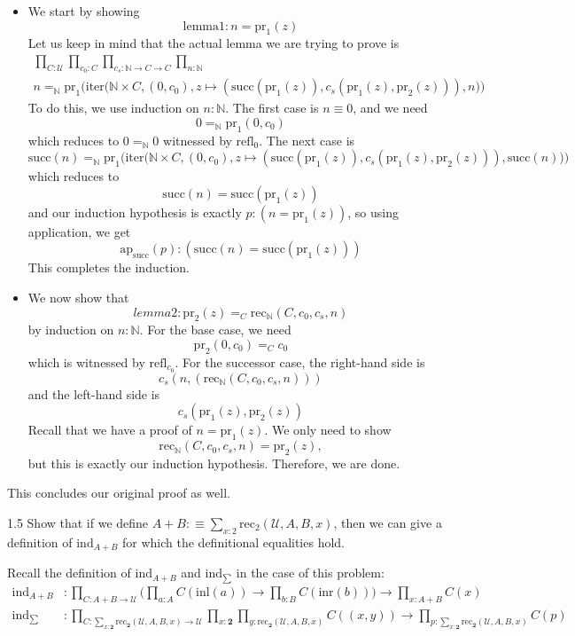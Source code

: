 \documentclass[14pt]{extarticle}
\newcommand{\N}{{\mathbb N}}
\newcommand{\0}{{\mathbf 0}}
\newcommand{\1}{{\mathbf 1}}
\newcommand{\2}{{\mathbf 2}}
\newcommand{\UU}{{\mathcal U}}
\newcommand{\mt}{\mapsto}
\newcommand{\rec}{\mathrm{rec}}
\newcommand{\su}{\mathrm{succ}}
\newcommand{\ind}{\mathrm{ind}}
\newcommand{\iter}{\mathrm{iter}}
\newcommand{\refl}{\mathrm{refl}}
\newcommand{\inl}{\mathrm{inl}}
\newcommand{\inr}{\mathrm{inr}}
\newcommand{\pr}{\mathrm{pr}}
\newcommand{\ap}{\mathrm{ap}}
\begin{document}
\begin{itemize}
\item We start by showing \[\mathrm{lemma1} : n = \pr_1(z)\] Let us keep in mind that the actual lemma we are trying to prove is
\begin{multline*}
\prod_{C : \UU}\prod_{c_0 : C}\prod_{c_s : \N \to C \to C}\prod_{n:\N} \\
n =_\N \pr_1\Big(\iter\Big(\N \times C, (0,c_0), z \mt (\su(\pr_1(z)) ,c_s(\pr_1(z), \pr_2(z))), n\Big)\Big)
\end{multline*}
To do this, we use induction on $n:\N$. The first case is $n \equiv 0$, and we need
\[0 =_\N \pr_1(0, c_0)\] which reduces to $0 =_\N 0$ witnessed by $\refl_0$. The next case is 
\[\su(n) =_\N \pr_1\Big(\iter\Big(\N \times C, (0,c_0), z \mt (\su(\pr_1(z)) ,c_s(\pr_1(z), \pr_2(z))), \su(n)\Big)\Big)\]
which reduces to 
\[\su(n) = \su(\pr_1(z))\] and our induction hypothesis is exactly $p : (n = \pr_1(z))$, so using application, we get
\[\ap_{\su}(p) : (\su(n) = \su(\pr_1(z)))\] This completes the induction.

\item We now show that \[lemma2 : \pr_2(z) =_C \rec_\N(C, c_0, c_s,n)\] by induction on $n : \N$. For the base case, we need
\[\pr_2(0, c_0) =_C c_0\] which is witnessed by $\refl_{c_0}$. For the successor case, the right-hand side is
\[c_s(n, (\rec_\N(C, c_0, c_s, n)))\] and the left-hand side is
\[c_s(\pr_1(z), \pr_2(z))\] Recall that we have a proof of $n = \pr_1(z)$. We only need to show \[\rec_\N(C, c_0, c_s, n) = \pr_2(z),\] but this is exactly our induction hypothesis. Therefore, we are done.
\end{itemize}
This concludes our original proof as well.


\begin{prob}{1.5}{}
Show that if we define $A + B :\equiv \sum_{x:2}\rec_2(\UU,A,B,x)$, then we can give a definition of $\ind_{A+B}$ for which the definitional equalities hold.
\end{prob}
Recall the definition of $\ind_{A+B}$ and $\ind_{\sum}$ in the case of this problem:
\begin{align*}
\ind_{A+B} &: \prod_{C : A+B \to \UU} \Big(\prod_{a:A}C(\inl(a)) \to \prod_{b:B}C(\inr(b)) \Big) \to \prod_{x : A+B} C(x)\\
\ind_{\sum} &: \prod_{C : \sum_{x:\2}\rec_\2(\UU,A,B,x) \to \UU} \prod_{x:\2}\prod_{y : \rec_\2(\UU,A,B,x)}C((x,y)) \to \prod_{p : \sum_{x:\2}\rec_\2(\UU,A,B,x)}C(p)
\end{align*}
\end{document}
